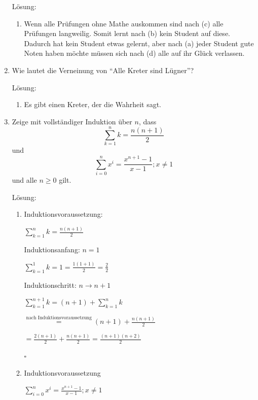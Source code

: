 \documentclass[../main.tex]{subfiles}
\begin{document}
\begin{enumerate}
	      Lösung:
	      \begin{enumerate}
		      \item Wenn alle Prüfungen ohne Mathe auskommen sind nach (c) alle Prüfungen langweilig.
		            Somit lernt nach (b) kein Student auf diese. Dadurch hat kein Student etwas gelernt, aber nach
		            (a) jeder Student gute Noten haben möchte müssen sich nach (d) alle auf ihr Glück verlassen.
	      \end{enumerate}
	\item Wie lautet die Verneinung von "`Alle Kreter sind Lügner"'?

	      Lösung:
	      \begin{enumerate}
		      \item Es gibt einen Kreter, der die Wahrheit sagt.
	      \end{enumerate}
	\item Zeige mit vollständiger Induktion über \( n \), dass
	      \[  \sum_{k = 1}^{n} k = \frac{n(n + 1)}{2} \]
	      und
	      \[  \sum_{i = 0}^{n} x^i = \frac{x^{n + 1} - 1}{ x - 1 };  x \neq 1\]
	      und alle \( n \geq 0 \) gilt.

	      Lösung:
	      \begin{enumerate}
		      \item Induktionsvoraussetzung:

		            \(  \sum_{k = 1}^{n} k = \frac{n(n + 1)}{2} \)
		            \vspace{10pt}

		            Induktionsanfang: \( n = 1 \)

		            \(  \sum_{k = 1}^{1} k = 1 =  \frac{1(1 + 1)}{2} = \frac{2}{2} \)
		            \vspace{10pt}

		            Induktionschritt: \( n \rightarrow  n + 1 \)

		            \(  \sum_{k = 1}^{n + 1} k = (n + 1) + \sum_{k = 1}^{n} k  \)

		            \( \stackrel{\text{nach Induktionsvoraussetzung}}{=}
		            (n + 1) + \frac{n (n +1)}{2} \)

		            \(  = \frac{ 2(n + 1) }{2} + \frac{n (n +1)}{2}
		            = \frac{(n + 1)(n + 2)}{2}  \)

		            \( \square \)
		      \item Induktionsvoraussetzung

		            \( \sum_{i = 0}^{n} x^i = \frac{x^{n + 1} - 1}{ x - 1 };  x \neq 1 \)
		            \vspace{10pt}


\end{enumerate}
\end{enumerate}
\end{document}
